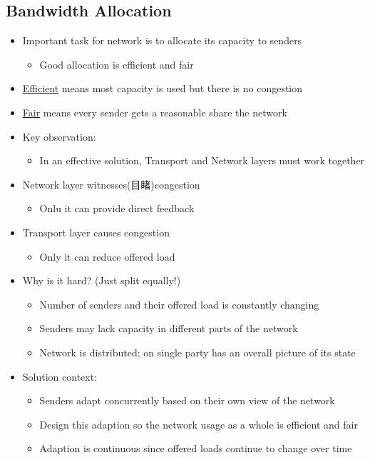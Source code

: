 \documentclass[12pt]{ctexart}   %
\begin{document}
	\subsection{Bandwidth Allocation}
	\begin{itemize}
		\item Important task for network is to allocate its capacity to senders
		\begin{itemize}
			\item Good allocation is efficient and fair
		\end{itemize}
		
		\item \underline{Efficient} means most capacity is used but there is no congestion
		
		\item \underline{Fair} means every sender gets a reasonable share the network
		
		\item Key observation:
		\begin{itemize}
			\item In an effective solution, Transport and Network layers must work together
		\end{itemize}
		
		\item Network layer witnesses(目睹)congestion
		\begin{itemize}
			\item Onlu it can provide direct feedback
		\end{itemize}
		
		\item Transport layer causes congestion
		\begin{itemize}
			\item Only it can reduce offered load
		\end{itemize}
		
		\item Why is it hard? (Just split equally!)
		\begin{itemize}
			\item Number of senders and their offered load is constantly changing
			\item Senders may lack capacity in different parts of the network
			\item Network is distributed; on single party has an overall picture of its state
		\end{itemize}
		
		\item Solution context:
		\begin{itemize}
			\item Senders adapt concurrently based on their own view of the network
			\item Design this adaption so the network usage as a whole is efficient and fair
			\item Adaption is continuous since offered loads continue to change over time
		\end{itemize}
	\end{itemize}
	
\end{document}
